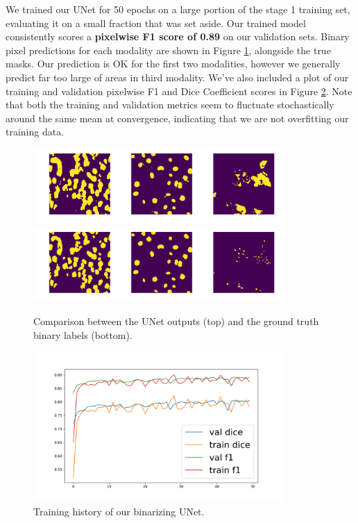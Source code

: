\documentclass[paper=letter, fontsize=12pt]{article}
\numberwithin{equation}{section} %
\numberwithin{figure}{section} %
\numberwithin{table}{section} %
\begin{document}
We trained our UNet for 50 epochs on a large portion of the stage 1 training
set, evaluating it on a small fraction that was set aside.  Our trained model
consistently scores a \textbf{pixelwise F1 score of 0.89} on our validation
sets.  Binary pixel predictions for each modality are shown in Figure
\ref{fig:unet-output}, alongside the true masks.  Our prediction is OK for the
first two modalities, however we generally predict far too large of areas in
third modality.  We've also included a plot of our training and validation
pixelwise F1 and Dice Coefficient scores in Figure \ref{fig:unet-history}.
Note that both the training and validation metrics seem to fluctuate
stochastically around the same mean at convergence, indicating that we are not
overfitting our training data.

\begin{figure}[H]
    \centering
    \includegraphics[width=0.85\textwidth]{./figs/unet-output.png}
    \includegraphics[width=0.85\textwidth]{./figs/ground-truth-binary.png}
    \caption{Comparison between the UNet outputs (top) and the ground truth
    binary labels (bottom).}
    \label{fig:unet-output}
\end{figure}

\begin{figure}[H]
    \centering
    \includegraphics[width=0.85\textwidth]{./figs/unet-score-history.png}
    \caption{Training history of our binarizing UNet.}
    \label{fig:unet-history}
\end{figure}
\end{document}
